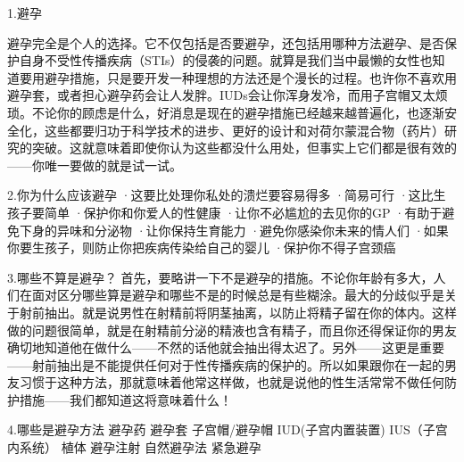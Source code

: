 \documentclass[12pt,UTF8,openany]{ctexbook}
\begin{document}
1.避孕

避孕完全是个人的选择。它不仅包括是否要避孕，还包括用哪种方法避孕、是否保护自身不受性传播疾病（STIs）的侵袭的问题。就算是我们当中最懒的女性也知道要用避孕措施，只是要开发一种理想的方法还是个漫长的过程。也许你不喜欢用避孕套，或者担心避孕药会让人发胖。IUDs会让你浑身发冷，而用子宫帽又太烦琐。不论你的顾虑是什么，好消息是现在的避孕措施已经越来越普遍化，也逐渐安全化，这些都要归功于科学技术的进步、更好的设计和对荷尔蒙混合物（药片）研究的突破。这就意味着即使你认为这些都没什么用处，但事实上它们都是很有效的——你唯一要做的就是试一试。

2.你为什么应该避孕
·这要比处理你私处的溃烂要容易得多
·简易可行
·这比生孩子要简单
·保护你和你爱人的性健康
·让你不必尴尬的去见你的GP
·有助于避免下身的异味和分泌物
·让你保持生育能力
·避免你感染你未来的情人们
·如果你要生孩子，则防止你把疾病传染给自己的婴儿
·保护你不得子宫颈癌

3.哪些不算是避孕？
首先，要略讲一下不是避孕的措施。不论你年龄有多大，人们在面对区分哪些算是避孕和哪些不是的时候总是有些糊涂。最大的分歧似乎是关于射前抽出。就是说男性在射精前将阴茎抽离，以防止将精子留在你的体内。这样做的问题很简单，就是在射精前分泌的精液也含有精子，而且你还得保证你的男友确切地知道他在做什么——不然的话他就会抽出得太迟了。另外——这更是重要——射前抽出是不能提供任何对于性传播疾病的保护的。所以如果跟你在一起的男友习惯于这种方法，那就意味着他常这样做，也就是说他的性生活常常不做任何防护措施——我们都知道这将意味着什么！

4.哪些是避孕方法
避孕药
避孕套
子宫帽/避孕帽
IUD(子宫内置装置)
IUS（子宫内系统）
植体
避孕注射
自然避孕法
紧急避孕
\end{document}
